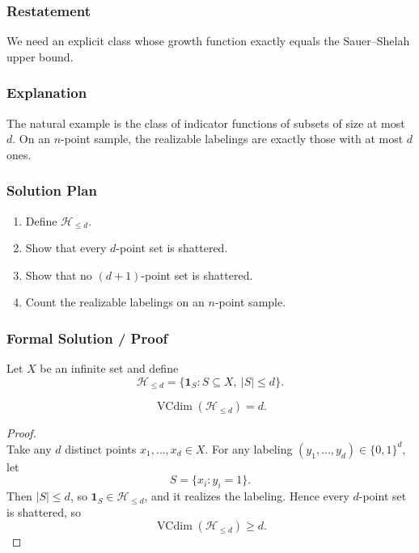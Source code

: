\documentclass{article}
\newcommand{\vcdim}{\operatorname{VCdim}}
\newcommand{\zeroone}{\{0,1\}}
\begin{document}
\begin{solutionbox}

\subsubsection{Restatement}

We need an explicit class whose growth function exactly equals the
Sauer--Shelah upper bound.

\subsubsection{Explanation}

The natural example is the class of indicator functions of subsets of size at
most \(d\). On an \(n\)-point sample, the realizable labelings are exactly those
with at most \(d\) ones.

\subsubsection{Solution Plan}

\begin{enumerate}[leftmargin=2.5em]
    \item Define \(\mathcal{H}_{\le d}\).
    \item Show that every \(d\)-point set is shattered.
    \item Show that no \((d+1)\)-point set is shattered.
    \item Count the realizable labelings on an \(n\)-point sample.
\end{enumerate}

\subsubsection{Formal Solution / Proof}

Let \(X\) be an infinite set and define
\[
\mathcal{H}_{\le d}
=
\{\mathbf{1}_S : S\subseteq X,\ |S|\le d\}.
\]

\begin{claim}
\[
\vcdim(\mathcal{H}_{\le d})=d.
\]
\end{claim}

\begin{proof}
\leavevmode\\
Take any \(d\) distinct points \(x_1,\dots,x_d\in X\). For any labeling
\((y_1,\dots,y_d)\in\zeroone^d\), let
\[
S=\{x_i:y_i=1\}.
\]
Then \(|S|\le d\), so \(\mathbf{1}_S\in\mathcal{H}_{\le d}\), and it realizes
the labeling. Hence every \(d\)-point set is shattered, so
\[
\vcdim(\mathcal{H}_{\le d})\ge d.
\]


\end{proof}
\end{solutionbox}
\end{document}
